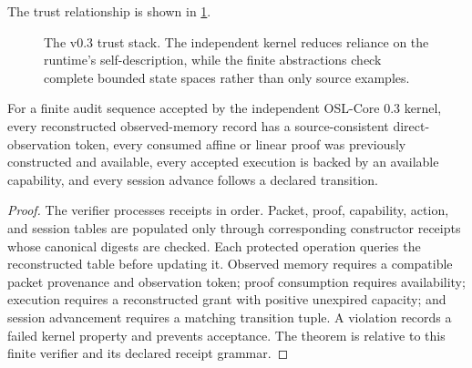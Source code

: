 The trust relationship is shown in \cref{fig:v03-trust-stack}.

\begin{figure}[ht]
\centering
{}
\caption{The v0.3 trust stack.  The independent kernel reduces reliance on the runtime's self-description, while the finite abstractions check complete bounded state spaces rather than only source examples.}
\label{fig:v03-trust-stack}
\end{figure}

\begin{theorem}
\label{thm:receipt-kernel-relative}
For a finite audit sequence accepted by the independent OSL-Core 0.3 kernel, every reconstructed observed-memory record has a source-consistent direct-observation token, every consumed affine or linear proof was previously constructed and available, every accepted execution is backed by an available capability, and every session advance follows a declared transition.
\end{theorem}

\begin{proof}
The verifier processes receipts in order.  Packet, proof, capability, action, and session tables are populated only through corresponding constructor receipts whose canonical digests are checked.  Each protected operation queries the reconstructed table before updating it.  Observed memory requires a compatible packet provenance and observation token; proof consumption requires availability; execution requires a reconstructed grant with positive unexpired capacity; and session advancement requires a matching transition tuple.  A violation records a failed kernel property and prevents acceptance.  The theorem is relative to this finite verifier and its declared receipt grammar.  \qedhere
\end{proof}

